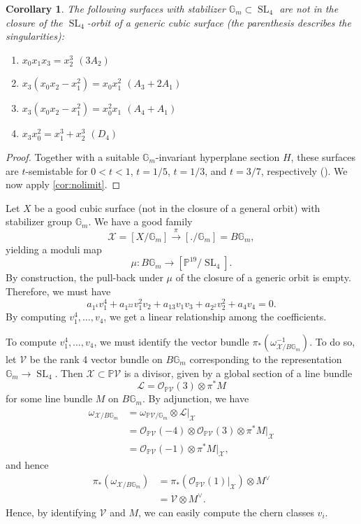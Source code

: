 \documentclass[12 pt]{amsart}
\newtheorem{corollary}{Corollary}[section]
\renewcommand{\P}{\mathbb{P}}
\newcommand{\SL}{\operatorname{SL}}
\newcommand{\<}{\left\langle}
\renewcommand{\>}{\right\rangle}
\begin{document}
\begin{corollary}
  The following surfaces with stabilizer $\mathbb G_m \subset \SL_4$ are not in the closure of the $\SL_4$-orbit of a generic cubic surface (the parenthesis describes the singularities):
  \begin{enumerate}
  \item $x_0x_1x_3 = x_2^3$ \quad $(3A_2)$
  \item $x_3(x_0x_2-x_1^2) = x_0x_1^2$ \quad $(A_3 + 2A_1)$
  \item $x_3(x_0x_2-x_1^2) = x_0^2x_1$ \quad $(A_4 + A_1)$
  \item $x_3x_0^2 = x_1^3 + x_2^3$ \quad $(D_4)$
  \end{enumerate}
\end{corollary}
\begin{proof}
  Together with a suitable $\mathbb G_m$-invariant hyperplane section $H$, these surfaces are $t$-semistable for $0 < t < 1$, $t = 1/5$, $t = 1/3$, and $t = 3/7$, respectively (\cite[Table~2]{gal.mar:19}).
  We now apply \autoref{cor:nolimit}.
\end{proof}

Let $X$ be a good cubic surface (not in the closure of a general orbit) with stabilizer group $\mathbb G_m$.
We have a good family
\[ \mathcal X = [X / \mathbb G_m] \xrightarrow{\pi} [. / \mathbb G_m] = B\mathbb G_m,\]
yielding a moduli map
\[\mu \colon B \mathbb G_m \to [\mathbb P^{19}/\SL_4].\]
By construction, the pull-back under $\mu$ of the closure of a generic orbit is empty.
Therefore, we must have
\[ a_{1^4} v_1^4 + a_{1^22}v_1^2v_2 + a_{13}v_1v_3 + a_{2^2}v_2^2 + a_4v_4 = 0.\]
By computing $v_1^4, \dots, v_4$, we get a linear relationship among the coefficients.

To compute $v_1^4, \dotso, v_4$, we must identify the vector bundle $\pi_* \left( \omega_{\mathcal X/B\mathbb G_m}^{-1}\right)$.
To do so, let $\mathcal V$ be the rank 4 vector bundle on $B \mathbb G_m$ corresponding to the representation $\mathbb G_m \to \SL_4$.
Then $\mathcal X \subset \P \mathcal V$ is a divisor, given by a global section of a line bundle
\[ \mathcal L = \mathcal O_{\P \mathcal V}(3) \otimes \pi^* M\]
for some line bundle $M$ on $B\mathbb G_m$.
By adjunction, we have
\begin{align*}
  \omega_{\mathcal X/B\mathbb G_m} &= \omega_{\P \mathcal V / \mathbb G_m} \otimes \mathcal L \big|_{\mathcal X}\\
                                   &= \mathcal O_{\P \mathcal V}(-4) \otimes \mathcal O_{\P \mathcal V}(3) \otimes \pi^* M \big|_{\mathcal X} \\
                                   &= \mathcal O_{\P \mathcal V}(-1) \otimes \pi^* M \big |_{\mathcal X},
\end{align*}
and hence
\begin{align*}
  \pi_* \left( \omega_{\mathcal X/B\mathbb G_m}  \right) &= \pi_* \left( \mathcal O_{\P \mathcal V}(1) \big|_{\mathcal X} \right) \otimes M^\vee \\
  &= \mathcal V \otimes M^\vee.
\end{align*}
Hence, by identifying $\mathcal V$ and $M$, we can easily compute the chern classes $v_i$.
\end{document}
